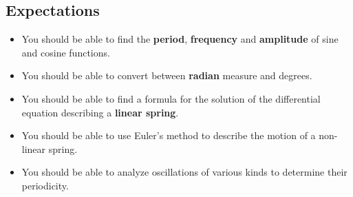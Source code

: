 \subsection{Expectations}
\label{subsec:expectations}

\begin{itemize}

\item You should be able to find the {\bf period}, {\bf frequency} and
  {\bf amplitude} of sine and cosine functions.

\item You should be able to convert between {\bf radian} measure and
  degrees.

\item You should be able to find a formula for the solution of the
  differential equation describing a {\bf linear spring}.

\item You should be able to use Euler's method to describe the motion
  of a non-linear spring.

\item You should be able to analyze oscillations of various kinds to
  determine their periodicity.

\end{itemize}

\cleardoublepage